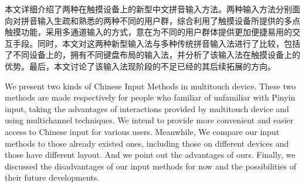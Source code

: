 

\cleardoublepage
\begin{cabstract}

  本文详细介绍了两种在触摸设备上的新型中文拼音输入方法。两种输入方法分别面向对拼音输入生疏和熟悉的两种不同的用户群，综合利用了触摸设备所提供的多点触摸功能，采用多通道输入的方式，意在为不同的用户群体提供更加便捷易用的交互手段。同时，本文对这两种新型输入法与多种传统拼音输入法进行了比较，包括了不同设备上的，拥有不同键盘布局的输入法，并分析了该输入法在触摸设备上的优势。最后，本文讨论了该输入法现阶段的不足已经的其后续拓展的方向。

\end{cabstract}

\cleardoublepage
\begin{eabstract}

  We present two kinds of Chinese Input Methods in multitouch device. These two methods are made respectively for people who familiar of unfamiliar with Pinyin input, taking the advantages of interactions provided by multitouch device and using multichannel techniques. We intend to provide more convenient and easier access to Chinese input for various users. Meanwhile, We compare our input methods to those already existed ones, including those on different devices and those have different layout. And we point out the advantages of ours. Finally, we discussed the disadvantages of our input methods for now and the possibilities of their future developments.

\end{eabstract}


